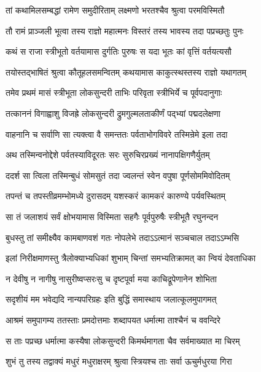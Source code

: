 
\twolineshloka
{तां कथामिलसम्बद्धां रामेण समुदीरिताम्}
{लक्ष्मणो भरतश्चैव श्रुत्वा परमविस्मितौ} %

\twolineshloka
{तौ रामं प्राञ्जली भूत्वा तस्य राज्ञो महात्मनः}
{विस्तरं तस्य भावस्य तदा पप्रच्छतुः पुनः} %

\twolineshloka
{कथं स राजा स्त्रीभूतो वर्तयामास दुर्गतिः}
{पुरुषः स यदा भूतः कां वृत्तिं वर्तयत्यसौ} %

\twolineshloka
{तयोस्तद्भाषितं श्रुत्वा कौतूहलसमन्वितम्}
{कथयामास काकुत्स्थस्तस्य राज्ञो यथागतम्} %

\twolineshloka
{तमेव प्रथमं मासं स्त्रीभूता लोकसुन्दरी}
{ताभिः परिवृता स्त्रीभिर्ये च पूर्वपदानुगाः} %

\twolineshloka
{तत्काननं विगाह्वाशु विजह्रे लोकसुन्दरी}
{द्रुमगुल्मलताकीर्णं पद्भ्यां पद्मदलेक्षणा} %

\twolineshloka
{वाहनानि च सर्वाणि सा त्यक्त्वा वै समन्ततः}
{पर्वताभोगविवरे तस्मिन्रेमे इला तदा} %

\twolineshloka
{अथ तस्मिन्वनोद्देशे पर्वतस्याविदूरतः}
{सरः सुरुचिरप्रख्यं नानापक्षिगणैर्युतम्} %

\twolineshloka
{ददर्श सा त्विला तस्मिन्बुधं सोमसुतं तदा}
{ज्वलन्तं स्वेन वपुषा पूर्णसोममिवोदितम्} %

\twolineshloka
{तपन्तं च तपस्तीव्रमम्भोमध्ये दुरासदम्}
{यशस्करं कामकरं कारुण्ये पर्यवस्थितम्} %

\twolineshloka
{सा तं जलाशयं सर्वं क्षोभयामास विस्मिता}
{सहगैः पूर्वपुरुषैः स्त्रीभूतै रघुनन्दन} %

\twolineshloka
{बुधस्तु तां समीक्ष्यैव कामबाणवशं गतः}
{नोपलेभे तदाऽऽत्मानं सञ्चचाल तदाऽऽम्भसि} %

\twolineshloka
{इलां निरीक्षमाणस्तु त्रैलोक्याभ्यधिकां शुभाम्}
{चिन्तां समभ्यतिक्रामत् का न्वियं देवताधिका} %

\twolineshloka
{न देवीषु न नागीषु नासुरीष्वप्सरःसु च}
{दृष्टपूर्वा मया काचिद्रूपेणानेन शोभिता} %

\twolineshloka
{सदृशीयं मम भवेद्यदि नान्यपरिग्रहः}
{इति बुद्धिं समास्थाय जलात्कूलमुपागमत्} %

\twolineshloka
{आश्रमं समुपागम्य ततस्ताः प्रमदोत्तमाः}
{शब्दापयत धर्मात्मा ताश्चैनं च ववन्दिरे} %

\twolineshloka
{स ताः पप्रच्छ धर्मात्मा कस्यैषा लोकसुन्दरी}
{किमर्थमागता चैव सर्वमाख्यात मा चिरम्} %

\twolineshloka
{शुभं तु तस्य तद्वाक्यं मधुरं मधुराक्षरम्}
{श्रुत्वा स्त्रियश्च ताः सर्वा ऊचुर्मधुरया गिरा} %

